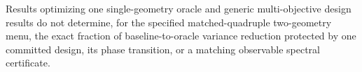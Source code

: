 Results optimizing one single-geometry oracle and generic multi-objective design results do not determine, for the specified matched-quadruple two-geometry menu, the exact fraction of baseline-to-oracle variance reduction protected by one committed design, its phase transition, or a matching observable spectral certificate.